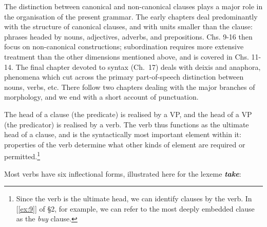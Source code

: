 The distinction between canonical and non-canonical clauses plays a major role in the organisation of the present grammar. The early chapters deal predominantly with the structure of canonical clauses, and with units smaller than the clause: phrases headed by nouns, adjectives, adverbs, and prepositions. Chs. 9-16 then focus on non-canonical constructions; subordination requires more extensive treatment than the other dimensions mentioned above, and is covered in Chs. 11-14. The final chapter devoted to syntax (Ch.~17) deals with deixis and anaphora, phenomena which cut across the primary part-of-speech distinction between nouns, verbs, etc. There follow two chapters dealing with the major branches of morphology, and we end with a short account of punctuation.


The head of a clause (the predicate) is realised by a VP, and the head of a VP (the predicator) is realised by a verb. The verb thus functions as the ultimate head of a clause, and is the syntactically most important element within it: properties of the verb determine what other kinds of element are required or permitted.\footnote{Since the verb is the ultimate head, we can identify clauses by the verb. In [\ref{ex:9}] of §2, for example, we can refer to the most deeply embedded clause as the \textit{buy} clause.}

Most verbs have six inflectional forms, illustrated here for the lexeme \textit{\textbf{take}}:

\begin{examples}
\item \label{ex:12}
\end{examples}

